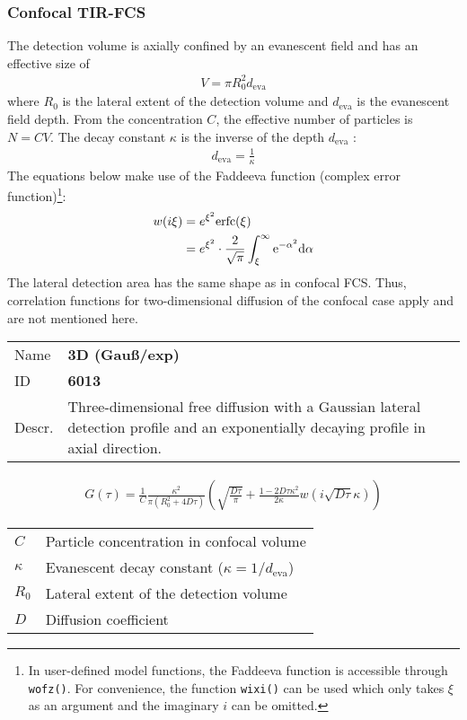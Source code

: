 \subsubsection{Confocal TIR-FCS}
The detection volume is axially confined by an evanescent field and has an effective size of
\begin{align}
V = \pi R_0^2 d_\mathrm{eva}
\end{align} 
where $R_0$ is the lateral extent of the detection volume and $d_\mathrm{eva}$ is the evanescent field depth. From the concentration $C$, the effective number of particles is $N=CV$.
The decay constant $\kappa$ is the inverse of the depth $d_\mathrm{eva}$ :
\begin{align}
d_\mathrm{eva} = \frac{1}{\kappa}
\end{align} 
The equations below make use of the Faddeeva function (complex error function)\footnote{In user-defined model functions, the Faddeeva function is accessible through \texttt{wofz()}. For convenience, the function \texttt{wixi()} can be used which only takes $\xi$ as an argument and the imaginary $i$ can be omitted.}:
\begin{align}
w(i\xi) &= e^{\xi^2} \mathrm{erfc}(\xi) \\
\notag &= e^{\xi^2} \cdot  \frac{2}{\sqrt{\pi}} \int_\xi^\infty \mathrm{e}^{-\alpha^2} \mathrm{d\alpha} \label{eq:faddeeva}
\end{align} 
The lateral detection area has the same shape as in confocal FCS. Thus, correlation functions for two-dimensional diffusion of the confocal case apply and are not mentioned here. \\
\vspace{2em}


\noindent \begin{tabular}{lp{}}
Name & \textbf{3D (Gauß/exp)} \\ 
ID & \textbf{6013} \\ 
Descr. &  Three-dimensional free diffusion with a Gaussian lateral detection profile and an exponentially decaying profile in axial direction. \\ 
\end{tabular}
\begin{align}
G(\tau) = \frac{1}{C}  \frac{ \kappa^2}{ \pi (R_0^2 +4D\tau)}
 \left( \sqrt{\frac{D \tau}{\pi}} + \frac{1 - 2 D \tau \kappa^2}{2 \kappa}  w\left(i \sqrt{D \tau} \kappa\right) \right)
\end{align} 
\begin{center}
\begin{tabular}{ll}
$C$ & Particle concentration in confocal volume \\ 
$\kappa$ &  Evanescent decay constant ($\kappa = 1/d_\mathrm{eva}$)\\ 
$R_0$ & Lateral extent of the detection volume \\
$D$ & Diffusion coefficient  \\
\end{tabular}
\end{center}
\vspace{2em}


